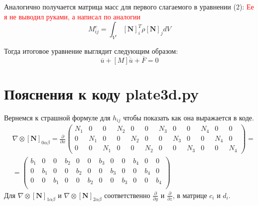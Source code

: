\documentclass[a4paper,12pt]{article}
\begin{document}
Аналогично получается матрица масс для первого слагаемого в уравнении (2):
\textcolor{red}{Ее я не выводил руками, а написал по аналогии}
\begin{equation}
    M_{ij}^e = \int_{V^e} [\textbf{N}]_i^T \rho [\textbf{N}]_j dV
\end{equation}

Тогда итоговое уравнение выглядит следующим образом:
\begin{equation}
    [H]\overline{u} + [M] \ddot{\overline{u}} + \overline{F} = 0
\end{equation}
\section{Пояснения к коду plate3d.py}
Вернемся к страшной формуле для $h_{ij}$ чтобы показать как она выражается в коде. 
\begin{align}
& \nabla \otimes [\textbf{N}]_{0\alpha \beta} = \frac{\partial}{\partial x}
\begin{pmatrix}
N_1 & 0 & 0 & N_2 & 0 & 0 & N_3 & 0 & 0 & N_4 & 0 & 0 \\
0 & N_1 & 0 & 0 & N_2 & 0 & 0 & N_3 & 0 & 0 & N_4 & 0 \\
0 & 0 & N_1 & 0 & 0 & N_2 & 0 & 0 & N_3 & 0 & 0 & N_4
\end{pmatrix} = \\
&=\begin{pmatrix}
b_1 & 0   & 0   & b_2 & 0   & 0   & b_3 & 0   & 0   & b_4 & 0   & 0 \\
0   & b_1 & 0   & 0   & b_2 & 0   & 0   & b_3 & 0   & 0   & b_4 & 0 \\
0   & 0   & b_1 & 0   & 0   & b_2 & 0   & 0   & b_3 & 0   & 0   & b_4\\
\end{pmatrix}
\end{align}
Для $\nabla \otimes [\textbf{N}]_{1\alpha \beta}$ и $\nabla \otimes [\textbf{N}]_{2\alpha \beta}$ соответственно $\frac{\partial}{\partial y}$ и $\frac{\partial}{\partial z}$, в матрице $c_i$ и $d_i $. 
\end{document}
